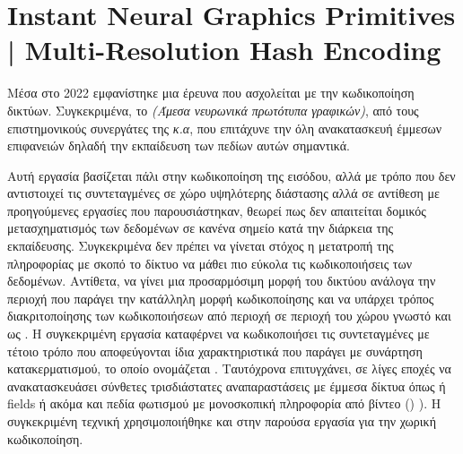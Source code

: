 \section{Instant Neural Graphics Primitives | Multi-Resolution Hash Encoding}
\par
    Μέσα στο 2022 εμφανίστηκε μια έρευνα που ασχολείται με την κωδικοποίηση δικτύων. Συγκεκριμένα, το \textit{(Άμεσα νευρωνικά πρωτότυπα γραφικών)}, από τους επιστημονικούς συνεργάτες της \textit{κ.α}, που επιτάχυνε την όλη ανακατασκευή έμμεσων επιφανειών δηλαδή την εκπαίδευση των πεδίων αυτών σημαντικά. 
\par 
    Αυτή εργασία βασίζεται πάλι στην κωδικοποίηση της εισόδου, αλλά με τρόπο που δεν αντιστοιχεί τις συντεταγμένες σε χώρο υψηλότερης διάστασης αλλά σε αντίθεση με προηγούμενες εργασίες που παρουσιάστηκαν, θεωρεί πως δεν απαιτείται δομικός μετασχηματισμός των δεδομένων σε κανένα σημείο κατά την διάρκεια της εκπαίδευσης. Συγκεκριμένα δεν πρέπει να γίνεται στόχος η μετατροπή της πληροφορίας με σκοπό το δίκτυο να μάθει πιο εύκολα τις κωδικοποιήσεις των δεδομένων. Αντίθετα, να γίνει μια προσαρμόσιμη μορφή του δικτύου ανάλογα την περιοχή που παράγει την κατάλληλη μορφή κωδικοποίησης και να υπάρχει τρόπος διακριτοποίησης των κωδικοποιήσεων από περιοχή σε περιοχή του χώρου γνωστό και ως . Η συγκεκριμένη εργασία καταφέρνει να κωδικοποιήσει τις συντεταγμένες με τέτοιο τρόπο που αποφεύγονται ίδια χαρακτηριστικά  που παράγει με συνάρτηση κατακερματισμού,  το οποίο ονομάζεται . Ταυτόχρονα επιτυγχάνει, σε λίγες εποχές να ανακατασκευάσει σύνθετες τρισδιάστατες αναπαραστάσεις με έμμεσα δίκτυα όπως  ή  fields ή ακόμα και πεδία φωτισμού με μονοσκοπική πληροφορία από βίντεο () \cite{peng2023intrinsicngp}). Η συγκεκριμένη τεχνική χρησιμοποιήθηκε και στην παρούσα εργασία για την χωρική κωδικοποίηση.


